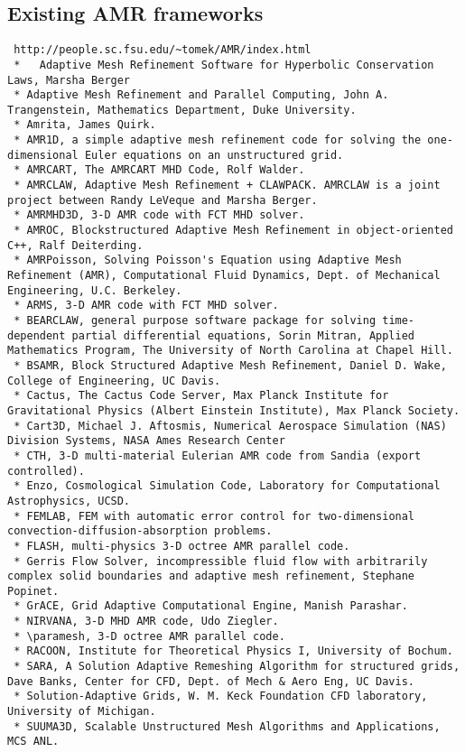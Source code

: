 \documentclass[10pt]{article}
\begin{document}
\subsection{Existing AMR frameworks} \label{ss:review}

\begin{verbatim}
 http://people.sc.fsu.edu/~tomek/AMR/index.html
 *   Adaptive Mesh Refinement Software for Hyperbolic Conservation Laws, Marsha Berger
 * Adaptive Mesh Refinement and Parallel Computing, John A. Trangenstein, Mathematics Department, Duke University.
 * Amrita, James Quirk.
 * AMR1D, a simple adaptive mesh refinement code for solving the one-dimensional Euler equations on an unstructured grid.
 * AMRCART, The AMRCART MHD Code, Rolf Walder.
 * AMRCLAW, Adaptive Mesh Refinement + CLAWPACK. AMRCLAW is a joint project between Randy LeVeque and Marsha Berger.
 * AMRMHD3D, 3-D AMR code with FCT MHD solver.
 * AMROC, Blockstructured Adaptive Mesh Refinement in object-oriented C++, Ralf Deiterding.
 * AMRPoisson, Solving Poisson's Equation using Adaptive Mesh Refinement (AMR), Computational Fluid Dynamics, Dept. of Mechanical Engineering, U.C. Berkeley.
 * ARMS, 3-D AMR code with FCT MHD solver.
 * BEARCLAW, general purpose software package for solving time-dependent partial differential equations, Sorin Mitran, Applied Mathematics Program, The University of North Carolina at Chapel Hill.
 * BSAMR, Block Structured Adaptive Mesh Refinement, Daniel D. Wake, College of Engineering, UC Davis.
 * Cactus, The Cactus Code Server, Max Planck Institute for Gravitational Physics (Albert Einstein Institute), Max Planck Society.
 * Cart3D, Michael J. Aftosmis, Numerical Aerospace Simulation (NAS) Division Systems, NASA Ames Research Center
 * CTH, 3-D multi-material Eulerian AMR code from Sandia (export controlled).
 * Enzo, Cosmological Simulation Code, Laboratory for Computational Astrophysics, UCSD.
 * FEMLAB, FEM with automatic error control for two-dimensional convection-diffusion-absorption problems.
 * FLASH, multi-physics 3-D octree AMR parallel code.
 * Gerris Flow Solver, incompressible fluid flow with arbitrarily complex solid boundaries and adaptive mesh refinement, Stephane Popinet.
 * GrACE, Grid Adaptive Computational Engine, Manish Parashar.
 * NIRVANA, 3-D MHD AMR code, Udo Ziegler.
 * \paramesh, 3-D octree AMR parallel code.
 * RACOON, Institute for Theoretical Physics I, University of Bochum.
 * SARA, A Solution Adaptive Remeshing Algorithm for structured grids, Dave Banks, Center for CFD, Dept. of Mech & Aero Eng, UC Davis.
 * Solution-Adaptive Grids, W. M. Keck Foundation CFD laboratory, University of Michigan.
 * SUUMA3D, Scalable Unstructured Mesh Algorithms and Applications, MCS ANL. 
\end{verbatim}
\end{document}

